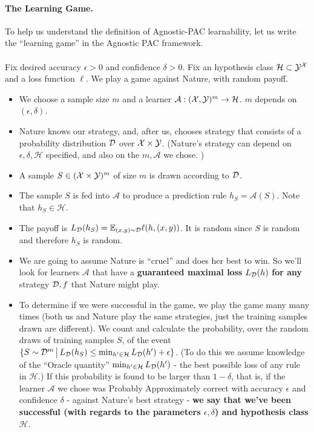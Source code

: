 \documentclass[11pt]{article}
\newcommand{\Ac}{\mathcal{A}}
\newcommand{\Hc}{\mathcal{H}}
\begin{document}
\paragraph{The Learning Game.} 
To help us understand the definition of Agnostic-PAC learnability, let us write
the ``learning game'' in the Agnostic PAC framework.
\\~\\
Fix desired accuracy $\epsilon>0$ and confidence $\delta>0$. Fix
an hypothesis class $\Hc \subset \Y^\X$ and a loss function $\ell$.
 We play a game against Nature, with random payoff.
  \begin{itemize}
    \item We choose a sample size $m$ and a learner $\Ac:(\X,\Y)^m \to \Hc$. 
    $m$ depends on $(\epsilon,\delta)$.
       \item Nature knows our strategy, and, after us, chooses strategy that
         consists of a probability distribution $\mathcal{D}$ over $\mathcal{X}\times \mathcal{Y}$.
     (Nature's strategy can depend on $\epsilon,\delta,\Hc$ specified, and also
     on the $m,\Ac$ we chose. )
   \item A sample $S\in(\mathcal{X}\times\mathcal{Y})^m$ of size $m$ is drawn according to $\mathcal{D}$.
    \item The sample $S$ is fed into $\Ac$ to produce a prediction rule
      $h_S=\Ac(S)$. Note that $h_S\in\Hc$.
    \item The payoff is $L_{\mathcal{D}}(h_S)=\mathbb{E}_{(x,y)\sim\mathcal{D}}\ell(h,(x,y))$. It is random since $S$ is random and
      therefore $h_S$ is random.
    \item We are going to assume Nature is ``cruel'' and does her best to win.
      So we'll look for learners $\Ac$ that have a {\bf guaranteed maximal 
      loss} $L_{\mathcal{D}}(h)$ {\bf for any} strategy $\mathcal{D},f$ that Nature might play.
      \item To determine if we were successful in the game, we play the game many many times 
      (both us and Nature play the same strategies, just the training samples drawn are different).
      We count and calculate the probability, over the random draws of training samples $S$, of the event
      $\{ S \sim \D^m \,\big |\,L_{\D}(h_S)\leq \min_{h'\in\Hc}L_\D(h') +
      \epsilon \}$. (To do this we assume knowledge of the ``Oracle quantity''
        $\min_{h'\in\Hc}L_\D(h')$ - the best possible loss of any rule in
      $\Hc$.) If this probability is found to be 
      larger than $1-\delta$, that is, if 
      the learner $\Ac$ we chose was Probably Approximately correct with accuracy $\epsilon$ and confidence $\delta$ - against Nature's best strategy - {\bf we say that we've been successful (with regards to the parameters $\epsilon,\delta$) and hypothesis class $\Hc$}.
\end{itemize}
\end{document}

